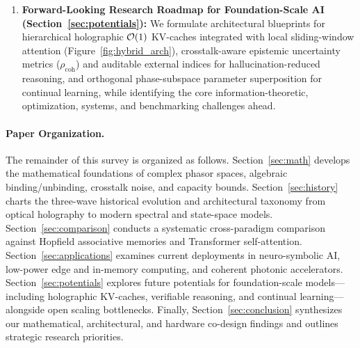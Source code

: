 \begin{enumerate}
    \item \textbf{Forward-Looking Research Roadmap for Foundation-Scale AI (Section~\ref{sec:potentials}):} We formulate architectural blueprints for hierarchical holographic $\mathcal{O}\!\left(1\right)$ KV-caches integrated with local sliding-window attention (Figure~\ref{fig:hybrid_arch}), crosstalk-aware epistemic uncertainty metrics ($\rho_{\mathrm{coh}}$) and auditable external indices for hallucination-reduced reasoning, and orthogonal phase-subspace parameter superposition for continual learning, while identifying the core information-theoretic, optimization, systems, and benchmarking challenges ahead.
\end{enumerate}

\paragraph{Paper Organization.}
The remainder of this survey is organized as follows.
Section~\ref{sec:math} develops the mathematical foundations of complex phasor spaces, algebraic binding/unbinding, crosstalk noise, and capacity bounds.
Section~\ref{sec:history} charts the three-wave historical evolution and architectural taxonomy from optical holography to modern spectral and state-space models.
Section~\ref{sec:comparison} conducts a systematic cross-paradigm comparison against Hopfield associative memories and Transformer self-attention.
Section~\ref{sec:applications} examines current deployments in neuro-symbolic AI, low-power edge and in-memory computing, and coherent photonic accelerators.
Section~\ref{sec:potentials} explores future potentials for foundation-scale models---including holographic KV-caches, verifiable reasoning, and continual learning---alongside open scaling bottlenecks.
Finally, Section~\ref{sec:conclusion} synthesizes our mathematical, architectural, and hardware co-design findings and outlines strategic research priorities.

